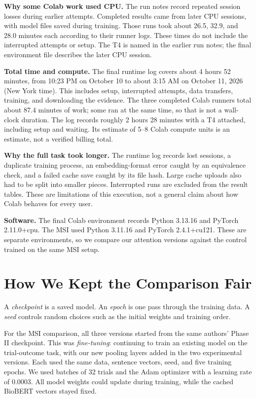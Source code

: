 \documentclass[10pt,letterpaper]{article}
\begin{document}
\textbf{Why some Colab work used CPU.} The run notes record repeated session losses during earlier attempts. Completed results came from later CPU sessions, with model files saved during training. Those runs took about 26.5, 32.9, and 28.0 minutes each according to their runner logs. These times do not include the interrupted attempts or setup. The T4 is named in the earlier run notes; the final environment file describes the later CPU session.

\textbf{Total time and compute.} The final runtime log covers about 4 hours 52 minutes, from 10:23 PM on October 10 to about 3:15 AM on October 11, 2026 (New York time). This includes setup, interrupted attempts, data transfers, training, and downloading the evidence. The three completed Colab runners total about 87.4 minutes of work; some ran at the same time, so that is not a wall-clock duration. The log records roughly 2 hours 28 minutes with a T4 attached, including setup and waiting. Its estimate of 5--8 Colab compute units is an estimate, not a verified billing total.

\textbf{Why the full task took longer.} The runtime log records lost sessions, a duplicate training process, an embedding-format error caught by an equivalence check, and a failed cache save caught by its file hash. Large cache uploads also had to be split into smaller pieces. Interrupted runs are excluded from the result tables. These are limitations of this execution, not a general claim about how Colab behaves for every user.

\textbf{Software.} The final Colab environment records Python 3.13.16 and PyTorch 2.11.0+cpu. The MSI used Python 3.11.16 and PyTorch 2.4.1+cu121. These are separate environments, so we compare our attention versions against the control trained on the same MSI setup.

\section{How We Kept the Comparison Fair}
A \emph{checkpoint} is a saved model. An \emph{epoch} is one pass through the training data. A \emph{seed} controls random choices such as the initial weights and training order.

For the MSI comparison, all three versions started from the same authors' Phase II checkpoint. This was \emph{fine-tuning}: continuing to train an existing model on the trial-outcome task, with our new pooling layers added in the two experimental versions. Each used the same data, sentence vectors, seed, and five training epochs. We used batches of 32 trials and the Adam optimizer with a learning rate of 0.0003. All model weights could update during training, while the cached BioBERT vectors stayed fixed.
\end{document}
